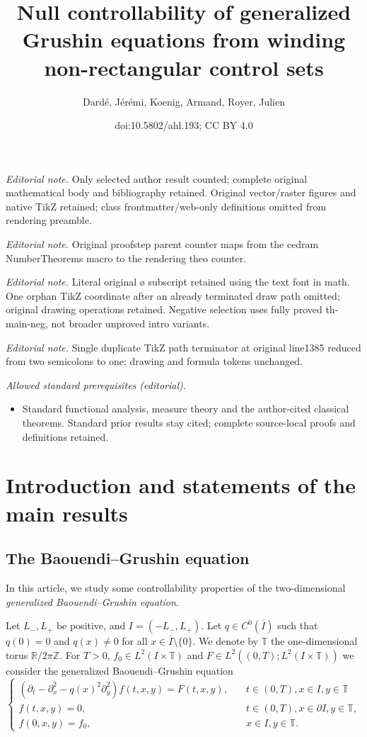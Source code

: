 \documentclass[10pt]{amsart}
\title{Null controllability of generalized Grushin equations from winding non-rectangular control sets}
\author{Dardé, Jérémi, Koenig, Armand, Royer, Julien}
\date{doi:10.5802/ahl.193; CC BY 4.0}
\theoremstyle{definition}\newtheorem{defi}[theo]{Definition}\newtheorem{rema}[theo]{Remark}\newtheorem{exam}[theo]{Example}\newtheorem{exem}[theo]{Example}\newtheorem{nota}[theo]{Notation}
\newcommand{\1}{\mathds 1}
\newcommand{\R}{\mathbb{R}}
\newcommand{\Z}{\mathbb{Z}}
\newcommand{\T}{\mathbb{T}}
\newcounter{proofstep}[theo]
\begin{document}
\maketitle
\noindent\textit{Editorial note.} Only selected author result counted; complete original mathematical body and bibliography retained. Original vector/raster figures and native TikZ retained; class frontmatter/web-only definitions omitted from rendering preamble.\par\medskip
\noindent\textit{Editorial note.} Original proofstep parent counter maps from the cedram NumberTheorems macro to the rendering theo counter.\par\medskip
\noindent\textit{Editorial note.} Literal original ø subscript retained using the text font in math. One orphan TikZ coordinate after an already terminated draw path omitted; original drawing operations retained. Negative selection uses fully proved th-main-neg, not broader unproved intro variants.\par\medskip
\noindent\textit{Editorial note.} Single duplicate TikZ path terminator at original line1385 reduced from two semicolons to one; drawing and formula tokens unchanged.\par\medskip
\noindent\textit{Allowed standard prerequisites (editorial).}\begin{itemize}
\item Standard functional analysis, measure theory and the author-cited classical theorems. Standard prior results stay cited; complete source-local proofs and definitions retained.
\end{itemize}\medskip

\section{Introduction and statements of the main results}

\subsection{The Baouendi--Grushin equation}

In this article, we study some controllability properties of the two-dimensional \emph{generalized Baouendi--Grushin equation}.

Let $L_-,L_+$ be positive, and $I = (-L_-,L_+)$. Let $q \in C^0(\overline I)$ such that $q(0)= 0$ and $q(x) \neq 0$ for all $x \in \overline I\setminus \{0\}$. We denote by $\T$ the one-dimensional torus $\R/2\pi \Z$. For $T > 0$, $f_0 \in L^2(I\times \T)$ and $F \in L^2((0,T);L^2(I \times \T))$ we consider the generalized Baouendi--Grushin equation
\begin{equation}\label{eq-grushin-gen-intro}
\left\{
\begin{array}{ll}
\left(\partial_t-\partial_x^2 - q(x)^2 \partial_y^2\right)f(t,x,y) = F(t,x,y),&\quad t\in (0,T), x\in I, y\in \T\\
f(t,x,y) = 0,&\quad t\in (0,T), x \in \partial I, y\in \T, \\
f(0,x,y) = f_0, & \quad x\in I, y\in \T.
\end{array}\right.
\end{equation}
\end{document}
